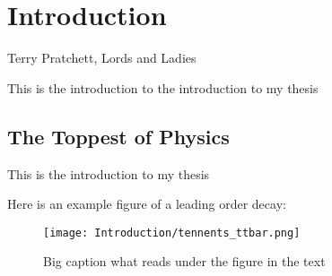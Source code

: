 
\chapter{Introduction}
\label{chap::Introduction}


%
{Terry Pratchett, Lords and Ladies}

This is the introduction to the introduction to my thesis
\\


\section{The Toppest of Physics}
\label{sec::intro}
This is the introduction to my thesis 

Here is an example figure of a leading order \ljets \ttbar decay:
\begin{figure}[p]
\centering
\texttt{[image: Introduction/tennents\_ttbar.png]}
\caption[Short caption that shows up in list-of-figures]{Big caption what reads under the figure in the text}
\label{fig::example}
\end{figure}

